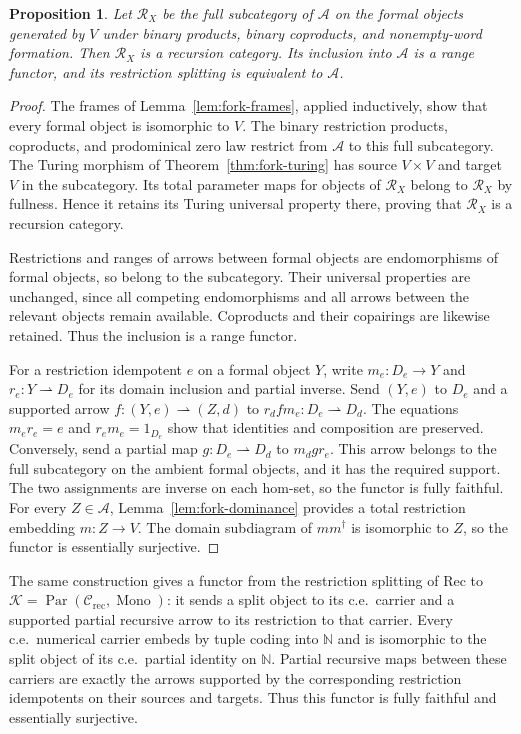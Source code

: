 \documentclass[11pt]{article}
\newtheorem{proposition}[theorem]{Proposition}
\newcommand{\N}{\mathbb N}
\begin{document}
\begin{proposition}\label{prop:fork-recursion}
Let $\mathscr R_X$ be the full subcategory of
$\mathcal A$ on the formal objects generated by $V$ under
binary products, binary coproducts, and nonempty-word formation.
Then $\mathscr R_X$ is a recursion category. Its inclusion
into $\mathcal A$ is a range functor, and its restriction
splitting is equivalent to $\mathcal A$.
\end{proposition}
\begin{proof}
The frames of Lemma~\ref{lem:fork-frames}, applied inductively,
show that every formal object is isomorphic to $V$.
The binary restriction products, coproducts, and prodominical
zero law restrict from $\mathcal A$ to this full subcategory.
The Turing morphism of Theorem~\ref{thm:fork-turing} has
source $V\times V$ and target $V$ in the subcategory.
Its total parameter maps for objects of $\mathscr R_X$ belong
to $\mathscr R_X$ by fullness. Hence it retains its Turing
universal property there, proving that $\mathscr R_X$ is a
recursion category.

Restrictions and ranges of arrows between formal objects are
endomorphisms of formal objects, so belong to the subcategory.
Their universal properties are unchanged, since all competing
endomorphisms and all arrows between the relevant objects remain
available. Coproducts and their copairings are likewise retained.
Thus the inclusion is a range functor.

For a restriction idempotent $e$ on a formal object $Y$, write
$m_e:D_e\to Y$ and $r_e:Y\rightharpoonup D_e$ for its
domain inclusion and partial inverse. Send $(Y,e)$ to $D_e$
and a supported arrow $f:(Y,e)\rightharpoonup(Z,d)$ to
$r_d f m_e:D_e\rightharpoonup D_d$.
The equations $m_er_e=e$ and $r_em_e=1_{D_e}$ show that
identities and composition are preserved. Conversely, send a
partial map $g:D_e\rightharpoonup D_d$ to $m_d g r_e$.
This arrow belongs to the full subcategory on the ambient
formal objects, and it has the required support. The two
assignments are inverse on each hom-set, so the functor is
fully faithful.
For every $Z\in\mathcal A$, Lemma~\ref{lem:fork-dominance}
provides a total restriction embedding $m:Z\to V$.
The domain subdiagram of $mm^\dagger$ is isomorphic to $Z$,
so the functor is essentially surjective.
\end{proof}

The same construction gives a functor from the restriction splitting
of $\mathrm{Rec}$ to
$\mathcal K=\operatorname{Par}(\mathcal C_{\mathrm{rec}},
\operatorname{Mono})$: it sends a split object to its c.e.\ carrier
and a supported partial recursive arrow to its restriction to that
carrier. Every c.e.\
numerical carrier embeds by tuple coding into $\N$ and is
isomorphic to the split object of its c.e.\ partial identity
on $\N$. Partial recursive maps between these carriers are
exactly the arrows supported by the corresponding restriction
idempotents on their sources and targets. Thus this functor is fully
faithful and essentially surjective.
\end{document}
